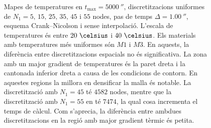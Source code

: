 \begin{figure}[ht]
	\caption{Mapes de temperatures en $t_\text{max} = 5000 \ \second$, discretitzacions uniformes de $N_1 = 5, \, 15, \, 25, \, 35, \, 45$ i $55$ nodes, pas de temps $\Delta = 1.00 \ \second$, esquema Crank--Nicolson i sense interpolació. L'escala de temperatures és entre $20 \ \celsius$ i $40 \ \celsius$. Els materials amb temperatures més uniformes són $M1$ i $M3$. En aquests, la diferència entre discretitzacions espacials no és significativa. La zona amb un major gradient de temperatures és la paret dreta i la cantonada inferior dreta a causa de les condicions de contorn. En aquestes regions la millora en densificar la malla és notable. La discretització amb $N_1 = 45$ té $4582$ nodes, mentre que la discretització amb $N_1 = 55$ en té $7474$, la qual cosa incrementa el temps de càlcul. Com s'aprecia, la diferència entre ambdues discretitzacions en la regió amb major gradient tèrmic és petita.}
	\label{fig:malla_5000}
\end{figure} 


